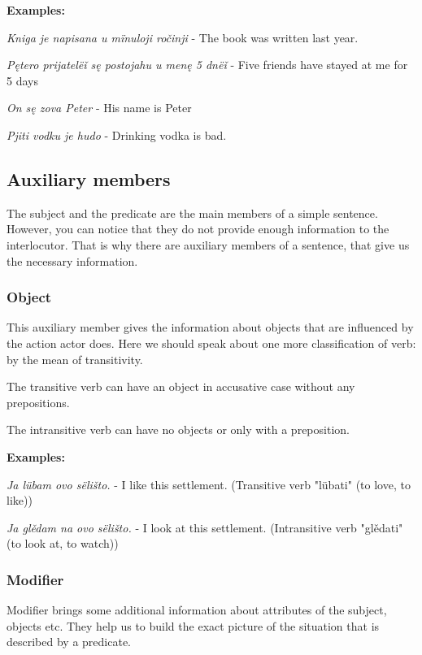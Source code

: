 \textbf{Examples:}

\textit{Kniga je napisana u mïnuloji ročinji} - The book was written last year.

\textit{Pętero prijatelëǐ sę postojahu u menę 5 dnëǐ} - Five friends have stayed at me for 5 days 

\textit{On sę zova Peter} - His name is Peter

\textit{Pjiti vodku je hudo} - Drinking vodka is bad.

\subsection{Auxiliary members}

The subject and the predicate are the main members of a simple sentence. However, you can notice that they do not provide  enough information to the interlocutor. That is why there are auxiliary members of a sentence, that give us the necessary information.

\subsubsection{Object}

This auxiliary member gives the information about objects that are influenced by the action actor does. 
Here we should speak about one more classification of verb: by the mean of transitivity.

The transitive verb can have an object in accusative case without any prepositions.

The intransitive verb can have no objects or only with a preposition. 

\textbf{Examples:}

\textit{Ja lübam ovo sëlišto.} - I like this settlement. (Transitive verb "lübati" (to love, to like))

\textit{Ja glědam na ovo sëlišto.} - I look at this settlement. (Intransitive verb "glědati" (to look at, to watch))

\subsubsection{Modifier}

Modifier brings some additional information about attributes of the subject, objects etc. They help us to build the exact picture of the situation that is described by a predicate.

